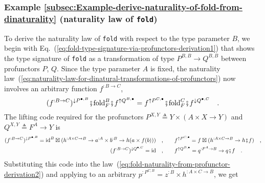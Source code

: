 \subsubsection{Example \label{subsec:Example-derive-naturality-of-fold-from-dinaturality}\ref{subsec:Example-derive-naturality-of-fold-from-dinaturality}
(naturality law of \lstinline!fold!)}

To derive the naturality law of \lstinline!fold! with respect to
the type parameter $B$, we begin with Eq.~(\ref{eq:fold-type-signature-via-profunctors-derivation1})
that shows the type signature of \lstinline!fold! as a transformation
of type $P^{B,B}\rightarrow Q^{B,B}$ between profunctors $P$, $Q$.
Since the type parameter $A$ is fixed, the naturality law~(\ref{eq:naturality-law-for-dinatural-transformations-of-profunctors})
now involves an arbitrary function $f^{:B\rightarrow C}$,
\begin{equation}
(f^{:B\rightarrow C})^{\downarrow P^{\bullet,B}}\bef\text{fold}_{F}^{B}\bef f^{\uparrow Q^{B,\bullet}}=f^{\uparrow P^{C,\bullet}}\bef\text{fold}_{F}^{C}\bef f^{\downarrow Q^{\bullet,C}}\quad.\label{eq:fold-naturality-from-profunctor-derivation2}
\end{equation}
The lifting code required for the profunctors $P^{X,Y}\triangleq Y\times\left(A\times X\rightarrow Y\right)$
and $Q^{X,Y}\triangleq F^{A}\rightarrow Y$ is
\begin{align*}
(f^{:B\rightarrow C})^{\downarrow P^{\bullet,B}}=\text{id}^{B}\boxtimes(h^{:A\times C\rightarrow B}\rightarrow a^{:A}\times b^{:B}\rightarrow h(a\times f(b)))\quad, & \quad\quad f^{\uparrow P^{C,\bullet}}=f\boxtimes(h^{:A\times C\rightarrow B}\rightarrow h\bef f)\quad,\\
(f^{:B\rightarrow C})^{\downarrow Q^{\bullet,C}}=\text{id}\quad, & \quad\quad f^{\uparrow Q^{B,\bullet}}=q^{:F^{A}\rightarrow B}\rightarrow q\bef f\quad.
\end{align*}
Substituting this code into the law~(\ref{eq:fold-naturality-from-profunctor-derivation2})
and applying to an arbitrary $p^{:P^{C,B}}=z^{:B}\times h^{:A\times C\rightarrow B}$,
we get
